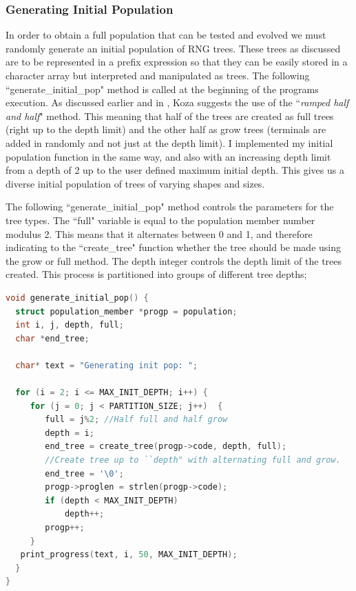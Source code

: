 \documentclass[a4paper,10.5pt]{article}
\begin{document}
\subsubsection{Generating Initial Population}
In order to obtain a full population that can be tested and evolved we must randomly generate an initial population of RNG trees. These trees as discussed are to be represented in a prefix expression so that they can be easily stored in a character array but interpreted and manipulated as trees. The following ``generate\_initial\_pop" method is called at the beginning of the programs execution. As discussed earlier and in \cite[p.11-14]{introgp}, Koza suggests the use of the ``\emph{ramped half and half}" method. This meaning that half of the trees are created as full trees (right up to the depth limit) and the other half as grow trees (terminals are added in randomly and not just at the depth limit). I implemented my initial population function in the same way, and also with an increasing depth limit from a depth of 2 up to the user defined maximum initial depth. This gives us a diverse initial population of trees of varying shapes and sizes.

The following ``generate\_initial\_pop" method controls the parameters for the tree types. The ``full" variable is equal to the population member number modulus 2. This means that it alternates between 0 and 1, and therefore indicating  to the ``create\_tree" function whether the tree should be made using the grow or full method. The depth integer controls the depth limit of the trees created. This process is partitioned into groups of different tree depths;
\begin{lstlisting}[language=C]
void generate_initial_pop() { 
  struct population_member *progp = population;
  int i, j, depth, full;
  char *end_tree;

  char* text = "Generating init pop: ";

  for (i = 2; i <= MAX_INIT_DEPTH; i++) {
     for (j = 0; j < PARTITION_SIZE; j++)  {  
        full = j%2; //Half full and half grow
        depth = i;
        end_tree = create_tree(progp->code, depth, full);
        //Create tree up to ``depth" with alternating full and grow.
        end_tree = '\0';
        progp->proglen = strlen(progp->code);
        if (depth < MAX_INIT_DEPTH) 
            depth++;
        progp++;
     }
   print_progress(text, i, 50, MAX_INIT_DEPTH);
  }
}
\end{lstlisting}
\end{document}
